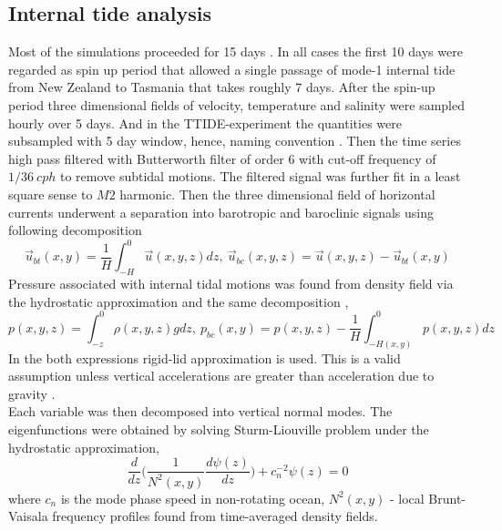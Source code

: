 \documentclass[12pt]{article}
\begin{document}
\subsection{Internal tide analysis}
\label{C3.sec:anlsys}
Most of the simulations proceeded for 15 days . In all 
cases the first 10 days were regarded as spin up period that allowed a single 
passage of mode-1 internal tide from New Zealand to Tasmania that takes roughly 7 days. After the 
spin-up period three 
dimensional fields of velocity, temperature and salinity were sampled hourly over 5 days. And in 
the TTIDE-experiment the quantities were subsampled with 5 day window, hence, naming convention 
. Then the time series high pass filtered with Butterworth filter 
of 
order $6$ with cut-off frequency of $1/36~cph$ to remove subtidal motions. The filtered signal was 
further fit in a least square sense to $M2$ harmonic. Then the three dimensional field of 
horizontal currents underwent a separation into barotropic and baroclinic signals using following 
decomposition \citep{cummins1997simulation, kunze2002internal, carter2008energetics}
\begin{equation}
\label{ch2:bt_bc_vel}
\vec{u}_{bt}(x,y) = \frac{1}{H} \int_{-H}^{0} \vec{u}(x,y,z)  dz,~\vec{u}_{bc}(x,y,z) =  
\vec{u}(x,y,z) - \vec{u}_{bt}(x,y)
\end{equation}
Pressure associated with internal tidal motions was found from density field via the  
hydrostatic approximation and the same decomposition \citep{kunze2002internal, kelly2010topo},
\begin{equation}
\label{ch2:bt_bc_pres}
p(x,y,z) = \int_{-z}^{0} \rho(x,y,z) g dz,~p_{bc}(x,y) = p(x,y,z) - \frac{1}{H} \int_{-H(x,y)}^{0} 
p(x,y,z) dz
\end{equation}
In the both expressions rigid-lid approximation is used. This is a valid assumption unless 
vertical accelerations are greater than acceleration due to gravity \citep{kelly2010topo}.\\
Each variable was then decomposed into vertical normal modes. The eigenfunctions were obtained by 
solving Sturm-Liouville problem under the hydrostatic approximation,
\begin{equation}
\frac{d}{dz}\Big( \frac{1}{N^2(x,y)}  \frac{d \psi(z)}{dz}\Big) + c^{-2}_n \psi(z) 
= 0
\end{equation}
where $c_n$ is the mode phase speed in non-rotating ocean, $N^2(x, y)$ - local Brunt-Vaisala 
frequency profiles found from time-averaged density fields.\\
\end{document}
